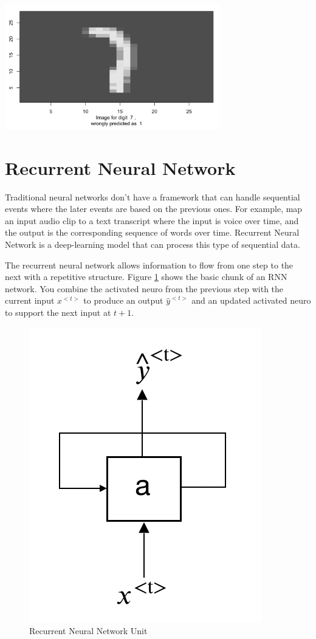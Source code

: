 \documentclass[
  12pt,
]{krantz}
\begin{document}
\includegraphics[width=0.7\textwidth,height=\textheight]{images/misclassified_img_cnn.png}

\hypertarget{recurrent-neural-network}{%
\section{Recurrent Neural Network}\label{recurrent-neural-network}}

Traditional neural networks don't have a framework that can handle sequential events where the later events are based on the previous ones. For example, map an input audio clip to a text transcript where the input is voice over time, and the output is the corresponding sequence of words over time. Recurrent Neural Network is a deep-learning model that can process this type of sequential data.

The recurrent neural network allows information to flow from one step to the next with a repetitive structure. Figure \ref{fig:rnnunit} shows the basic chunk of an RNN network. You combine the activated neuro from the previous step with the current input \(x^{<t>}\) to produce an output \(\hat{y}^{<t>}\) and an updated activated neuro to support the next input at \(t+1\).

\begin{figure}

{\centering \includegraphics[width=0.4\linewidth]{images/rnnunit} 

}

\caption{Recurrent Neural Network Unit}\label{fig:rnnunit}
\end{figure}
\end{document}
